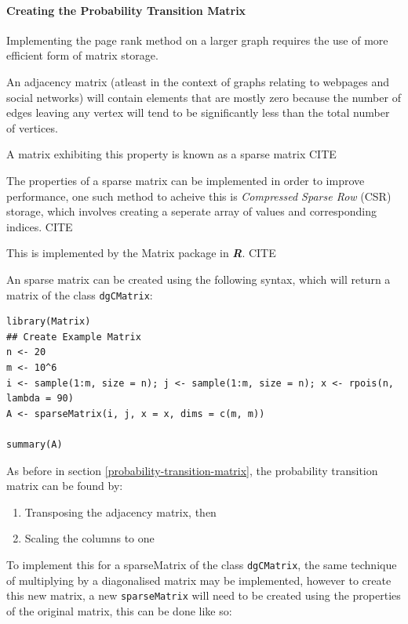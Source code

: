\documentclass[11pt]{article}
\begin{document}
\paragraph{Creating the Probability Transition Matrix}
\label{sec:orgb83d023}
Implementing the page rank method on a larger graph requires the use of more efficient form of matrix storage.

An adjacency matrix (atleast in the context of graphs relating to webpages and social networks) will contain elements that are mostly zero because the number of edges leaving any vertex will tend to be significantly less than the total number of vertices.

A matrix exhibiting this property is known as a sparse matrix CITE

The properties of a sparse matrix can be implemented in order to improve performance, one such method to acheive this is \emph{Compressed Sparse Row} (CSR) storage, which involves creating a seperate array of values and corresponding indices. CITE

This is implemented by the Matrix package in \textbf{\emph{R}}. CITE

An sparse matrix can be created using the following syntax, which will return a matrix of the class \texttt{dgCMatrix}:

\begin{verbatim}
library(Matrix)
## Create Example Matrix
n <- 20
m <- 10^6
i <- sample(1:m, size = n); j <- sample(1:m, size = n); x <- rpois(n, lambda = 90)
A <- sparseMatrix(i, j, x = x, dims = c(m, m))

summary(A)
\end{verbatim}

As before in section \ref{probability-transition-matrix}, the probability transition matrix can be found by:

\begin{enumerate}
\item Transposing the adjacency matrix, then
\item Scaling the columns to one
\end{enumerate}

To implement this for a sparseMatrix of the class \texttt{dgCMatrix}, the same technique of multiplying by a diagonalised matrix may be implemented, however to create this new matrix, a new \texttt{sparseMatrix} will need to be created using the properties of the original matrix, this can be done like so:
\end{document}
